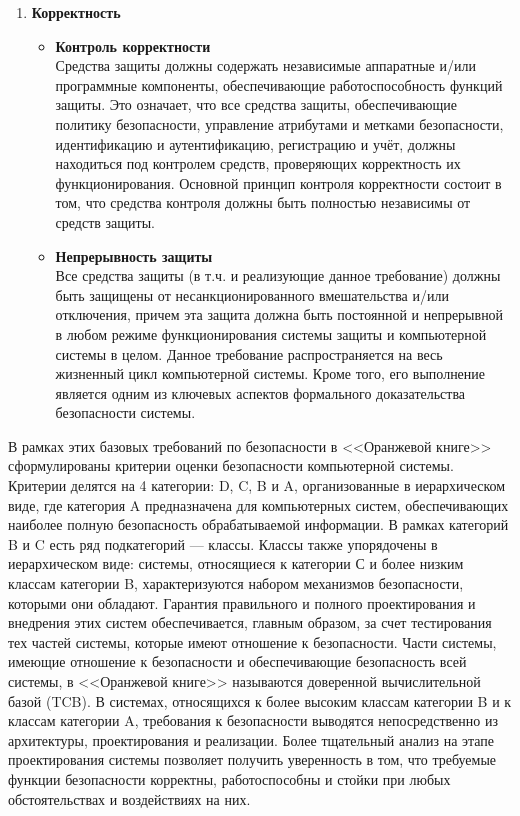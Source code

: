 \begin{enumerate}
\begin{itemize}
		на безопасность, для сокращения накладных расходов на дальнейший аудит и повышения эффективности анализа. Подлежащие аудиту данные должны быть надежно защищены от несанкционированного
		доступа, модификации и уничтожения.
	\end{itemize}
	\item \textbf{Корректность}
	\begin{itemize}
		\item \textbf{Контроль корректности}\\
		Средства защиты должны содержать независимые аппаратные и/или программные компоненты, обеспечивающие работоспособность функций защиты. Это означает, что все средства защиты,
		обеспечивающие политику безопасности, управление атрибутами и метками безопасности, идентификацию и аутентификацию, регистрацию и учёт, должны находиться под контролем средств,
		проверяющих корректность их функционирования. Основной принцип контроля корректности состоит в том, что средства контроля должны быть полностью независимы от средств защиты.
		\item \textbf{Непрерывность защиты}\\
		Все средства защиты (в т.ч. и реализующие данное требование) должны быть защищены от несанкционированного вмешательства и/или отключения, причем эта защита должна быть постоянной
		и непрерывной в любом режиме функционирования системы защиты и компьютерной системы в целом. Данное требование распространяется на весь жизненный цикл компьютерной системы.
		Кроме того, его выполнение является одним из ключевых аспектов формального доказательства безопасности системы.
	\end{itemize}
\end{enumerate}

В рамках этих базовых требований по безопасности в <<Оранжевой книге>> сформулированы критерии оценки безопасности компьютерной системы. Критерии делятся на 4 категории: D, C, B и A,
организованные в иерархическом виде, где категория A предназначена для компьютерных систем, обеспечивающих наиболее полную безопасность обрабатываемой информации. В рамках категорий B и C
есть ряд подкатегорий --- классы. Классы также упорядочены в иерархическом виде: системы, относящиеся к категории С и более низким классам категории B, характеризуются набором механизмов
безопасности, которыми они обладают. Гарантия правильного и полного проектирования и внедрения этих систем обеспечивается, главным образом, за счет тестирования тех частей системы,
которые имеют отношение к безопасности. Части системы, имеющие отношение к безопасности и обеспечивающие безопасность всей системы, в <<Оранжевой книге>> называются доверенной вычислительной базой (TCB).
В системах, относящихся к более высоким классам категории B и к классам категории A, требования к безопасности выводятся непосредственно из архитектуры, проектирования и реализации.
Более тщательный анализ на этапе проектирования системы позволяет получить уверенность в том, что требуемые функции безопасности корректны, работоспособны и стойки при
любых обстоятельствах и воздействиях на них.

